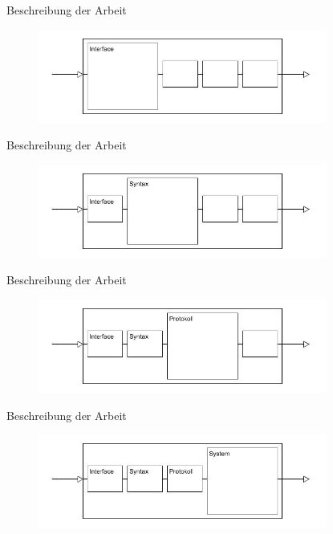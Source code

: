 \documentclass{beamer}
\begin{document}
\begin{frame}{Beschreibung der Arbeit}
\begin{figure}
\includegraphics[width=9.5cm]{int.jpg}
\end{figure}
\end{frame}

\begin{frame}{Beschreibung der Arbeit}
\begin{figure}
\includegraphics[width=9.5cm]{syn.jpg}
\end{figure}
\end{frame}

\begin{frame}{Beschreibung der Arbeit}
\begin{figure}
\includegraphics[width=9.5cm]{pro.jpg}
\end{figure}
\end{frame}

\begin{frame}{Beschreibung der Arbeit}
\begin{figure}
\includegraphics[width=9.5cm]{sys.jpg}
\end{figure}
\end{frame}
\end{document}
